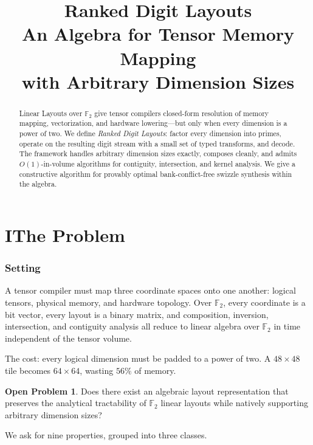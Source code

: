 \documentclass[11pt]{article}
\title{\textbf{Ranked Digit Layouts}\\[4pt]
\large An Algebra for Tensor Memory Mapping\\
with Arbitrary Dimension Sizes}
\author{}
\date{}
\theoremstyle{definition}
\newtheorem{openproblem}{Open Problem}
\theoremstyle{remark}
\newcommand{\F}{\mathbb{F}}
\begin{document}
\maketitle
\thispagestyle{empty}

\begin{abstract}
Linear Layouts over $\F_2$ give tensor compilers closed-form resolution of memory mapping, vectorization, and hardware lowering---but only when every dimension is a power of two.
We define \emph{Ranked Digit Layouts}: factor every dimension into primes, operate on the resulting digit stream with a small set of typed transforms, and decode.
The framework handles arbitrary dimension sizes exactly, composes cleanly, and admits $O(1)$-in-volume algorithms for contiguity, intersection, and kernel analysis.
We give a constructive algorithm for provably optimal bank-conflict-free swizzle synthesis within the algebra.
\end{abstract}

\part*{I\quad The Problem}

\section{Setting}

A tensor compiler must map three coordinate spaces onto one another: logical tensors, physical memory, and hardware topology.
Over $\F_2$, every coordinate is a bit vector, every layout is a binary matrix, and composition, inversion, intersection, and contiguity analysis all reduce to linear algebra over $\F_2$ in time independent of the tensor volume.

The cost: every logical dimension must be padded to a power of two.
A $48 \times 48$ tile becomes $64 \times 64$, wasting $56\%$ of memory.

\begin{openproblem}
Does there exist an algebraic layout representation that preserves the analytical tractability of $\F_2$ linear layouts while natively supporting arbitrary dimension sizes?
\end{openproblem}

\noindent We ask for nine properties, grouped into three classes.
\end{document}
